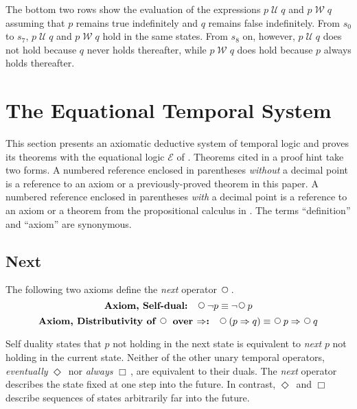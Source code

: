 \documentclass[fleqn, leqno]{article}
\newcommand{\impl}{\ensuremath{\Rightarrow}}        %
\newcommand{\Until}{\;\mathcal{U}\;}
\newcommand{\Wait}{\;\mathcal{W}\;}
\newcommand{\Next}{\;\,\text{\raisebox{3.5pt}{\circle{6}}}}
\newcommand{\Event}{\Diamond\,}
\newcommand{\Always}{\Box\,}
\newcommand{\spacer}{\vspace{-30pt}}
\begin{document}
The bottom two rows show the evaluation of the expressions $p\Until q$ and $p\Wait q$
assuming that $p$ remains true indefinitely and $q$ remains false indefinitely.
From $s_0$ to $s_7$, $p\Until q$ and $p\Wait q$ hold in the same states.
From $s_8$ on, however, $p\Until q$ does not hold because $q$ never holds thereafter,
while $p\Wait q$ does hold because $p$ always holds thereafter.

\section{The Equational Temporal System}

This section presents an axiomatic deductive system of temporal logic and proves its theorems with the equational
logic $\mathcal{E}$ of \cite{LADM}.
Theorems cited in a proof hint take two forms.
A numbered reference enclosed in parentheses \textit{without} a decimal point is a reference to an axiom or a previously-proved
theorem in this paper.
A numbered reference enclosed in parentheses \textit{with} a decimal point is a reference to an axiom or a
theorem from the propositional calculus in \cite{LADM}.
The terms ``definition'' and ``axiom'' are synonymous.\\

\subsection{Next}

The following two axioms define the \textit{next} operator $\Next$.
\begin{equation}\label{E:selfDual}
\textbf{Axiom, Self-dual:}\quad \Next\neg p \equiv \neg\Next p
\end{equation}
\begin{equation}\label{E:distNextImp}
\textbf{Axiom, Distributivity of $\Next$ over $\impl$:}\quad \Next (p \impl q) \equiv \Next p \impl \Next q
\end{equation}

Self duality states that $p$ not holding in the next state is equivalent to \textit{next} $p$ not holding in the current state.
Neither of the other unary temporal operators, \textit{eventually} $\Event$ nor \textit{always} $\Always$, are equivalent to their duals.
The \textit{next} operator describes the state fixed at one step into the future.
In contrast, $\Event$ and $\Always$ describe sequences of states arbitrarily far into the future.\\
\end{document}
